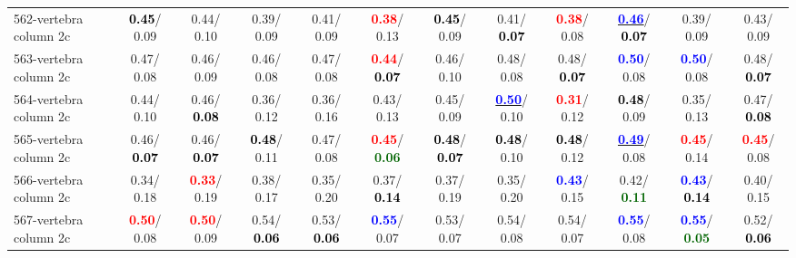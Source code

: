 \begin{table}[h]
\begin{center}
{\begin{tabular}{lc|c|c|c|c|c|c|c|c|c|c}
562-vertebra column 2c & \textcolor{black}{\textbf{  0.45}}/  0.09 &   0.44/  0.10 &   0.39/  0.09 &   0.41/  0.09 & \textcolor{red}{\textbf{  0.38}}/  0.13 & \textcolor{black}{\textbf{  0.45}}/  0.09 &   0.41/\textcolor{black}{\textbf{  0.07}} & \textcolor{red}{\textbf{  0.38}}/  0.08 & \underline{\textcolor{blue}{\textbf{  0.46}}}/\textcolor{black}{\textbf{  0.07}} &   0.39/  0.09 &   0.43/  0.09 \\
563-vertebra column 2c &   0.47/  0.08 &   0.46/  0.09 &   0.46/  0.08 &   0.47/  0.08 & \textcolor{red}{\textbf{  0.44}}/\textcolor{black}{\textbf{  0.07}} &   0.46/  0.10 &   0.48/  0.08 &   0.48/\textcolor{black}{\textbf{  0.07}} & \textcolor{blue}{\textbf{  0.50}}/  0.08 & \textcolor{blue}{\textbf{  0.50}}/  0.08 &   0.48/\textcolor{black}{\textbf{  0.07}} \\
564-vertebra column 2c &   0.44/  0.10 &   0.46/\textcolor{black}{\textbf{  0.08}} &   0.36/  0.12 &   0.36/  0.16 &   0.43/  0.13 &   0.45/  0.09 & \underline{\textcolor{blue}{\textbf{  0.50}}}/  0.10 & \textcolor{red}{\textbf{  0.31}}/  0.12 & \textcolor{black}{\textbf{  0.48}}/  0.09 &   0.35/  0.13 &   0.47/\textcolor{black}{\textbf{  0.08}} \\
565-vertebra column 2c &   0.46/\textcolor{black}{\textbf{  0.07}} &   0.46/\textcolor{black}{\textbf{  0.07}} & \textcolor{black}{\textbf{  0.48}}/  0.11 &   0.47/  0.08 & \textcolor{red}{\textbf{  0.45}}/\textcolor{darkgreen}{\textbf{  0.06}} & \textcolor{black}{\textbf{  0.48}}/\textcolor{black}{\textbf{  0.07}} & \textcolor{black}{\textbf{  0.48}}/  0.10 & \textcolor{black}{\textbf{  0.48}}/  0.12 & \underline{\textcolor{blue}{\textbf{  0.49}}}/  0.08 & \textcolor{red}{\textbf{  0.45}}/  0.14 & \textcolor{red}{\textbf{  0.45}}/  0.08 \\ \hline
566-vertebra column 2c &   0.34/  0.18 & \textcolor{red}{\textbf{  0.33}}/  0.19 &   0.38/  0.17 &   0.35/  0.20 &   0.37/\textcolor{black}{\textbf{  0.14}} &   0.37/  0.19 &   0.35/  0.20 & \textcolor{blue}{\textbf{  0.43}}/  0.15 &   0.42/\textcolor{darkgreen}{\textbf{  0.11}} & \textcolor{blue}{\textbf{  0.43}}/\textcolor{black}{\textbf{  0.14}} &   0.40/  0.15 \\
567-vertebra column 2c & \textcolor{red}{\textbf{  0.50}}/  0.08 & \textcolor{red}{\textbf{  0.50}}/  0.09 &   0.54/\textcolor{black}{\textbf{  0.06}} &   0.53/\textcolor{black}{\textbf{  0.06}} & \textcolor{blue}{\textbf{  0.55}}/  0.07 &   0.53/  0.07 &   0.54/  0.08 &   0.54/  0.07 & \textcolor{blue}{\textbf{  0.55}}/  0.08 & \textcolor{blue}{\textbf{  0.55}}/\textcolor{darkgreen}{\textbf{  0.05}} &   0.52/\textcolor{black}{\textbf{  0.06}} \\

\end{tabular}}
\end{center}
\end{table}
